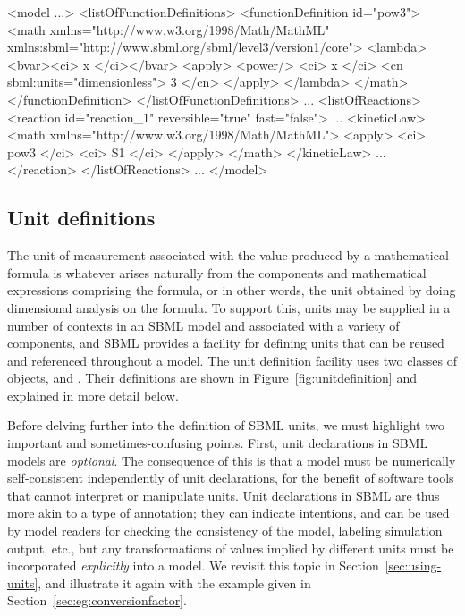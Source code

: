\begin{example}
<model ...>
   <listOfFunctionDefinitions>
       <functionDefinition id="pow3">
           <math xmlns="http://www.w3.org/1998/Math/MathML"
                 xmlns:sbml="http://www.sbml.org/sbml/level3/version1/core">
               <lambda>
                   <bvar><ci> x </ci></bvar>
                   <apply> <power/> <ci> x </ci> <cn sbml:units="dimensionless"> 3 </cn> </apply>
               </lambda>
           </math>
       </functionDefinition>
   </listOfFunctionDefinitions>
   ...
   <listOfReactions>
       <reaction id="reaction_1" reversible="true" fast="false">
           ...
           <kineticLaw>
               <math xmlns="http://www.w3.org/1998/Math/MathML">
                   <apply> <ci> pow3 </ci> <ci> S1 </ci> </apply>
               </math>
           </kineticLaw>
           ...
       </reaction>
   </listOfReactions>
   ...
</model>\end{example}


\subsection{Unit definitions}
\label{sec:unitdefinitions}

The unit of measurement associated with the value produced by a
mathematical formula is whatever arises naturally from the
components and mathematical expressions comprising the formula, or
in other words, the unit obtained by doing dimensional analysis on
the formula.  To support this, units may be supplied in a number
of contexts in an SBML model and associated with a variety of
components, and SBML provides a facility for defining units that
can be reused and referenced throughout a model.  The unit
definition facility uses two classes of objects, \UnitDefinition
and \Unit.  Their definitions are shown in
Figure~\vref{fig:unitdefinition} and explained in more detail
below.

Before delving further into the definition of SBML units, we must
highlight two important and sometimes-confusing points.  First,
unit declarations in SBML models are \emph{optional}.  The
consequence of this is that a model must be numerically
self-consistent independently of unit declarations, for the
benefit of software tools that cannot interpret or manipulate
units.  Unit declarations in SBML are thus more akin to a type of
annotation; they can indicate intentions, and can be used by model
readers for checking the consistency of the model, labeling
simulation output, etc., but any transformations of values implied
by different units must be incorporated \emph{explicitly} into a
model.  We revisit this topic in Section~\ref{sec:using-units},
and illustrate it again with the example given in
Section~\ref{sec:eg:conversionfactor}.

